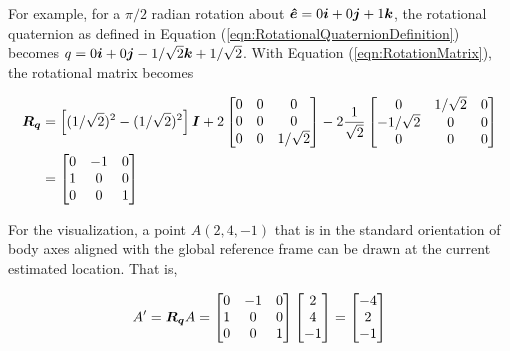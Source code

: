 For example, for a $\pi/2$ radian rotation about $\boldsymbol{\hat{e}} = 0\boldsymbol{i}+0\boldsymbol{j}+1\boldsymbol{k}$, the rotational quaternion as defined in Equation (\ref{eqn:RotationalQuaternionDefinition}) becomes $q = 0\boldsymbol{i}+0\boldsymbol{j}-1/\sqrt{2}\boldsymbol{k}+1/\sqrt{2}$.  With Equation (\ref{eqn:RotationMatrix}), the rotational matrix becomes

\begin{equation}
  \begin{aligned}
    \boldsymbol{R_q} & = \left[ (1/\sqrt{2})^2 - (1/\sqrt{2})^2 \right] \boldsymbol{I} + 2 \begin{bmatrix} 0 & 0 & 0 \\ 0 & 0 & 0 \\ 0 & 0 & 1/\sqrt{2} \end{bmatrix} - 2 \frac{1}{\sqrt{2}} \begin{bmatrix} 0 & 1/\sqrt{2} & 0 \\ -1/\sqrt{2} & 0 & 0 \\ 0 & 0 & 0 \\ \end{bmatrix} \\
      & = \begin{bmatrix} 0 & -1 & 0 \\ 1 & 0 & 0 \\ 0 & 0 & 1 \\\end{bmatrix}
  \end{aligned}
\end{equation}

For the visualization, a point $A (2, 4, -1)$ that is in the standard orientation of body axes aligned with the global reference frame can be drawn at the current estimated location.  That is,

\begin{equation}
  A' = \boldsymbol{R_q} A = \begin{bmatrix} 0 & -1 & 0 \\ 1 & 0 & 0 \\ 0 & 0 & 1 \\\end{bmatrix} \begin{bmatrix} 2 \\ 4 \\ -1 \end{bmatrix} = \begin{bmatrix} -4 \\ 2 \\ -1 \end{bmatrix}
\end{equation}

